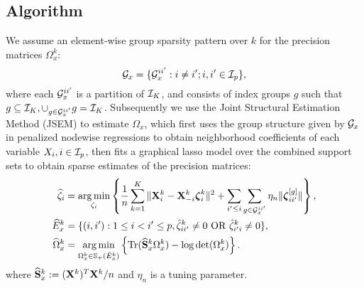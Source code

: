 \subsection{Algorithm}
\label{sec:algosection}
We assume an element-wise group sparsity pattern over $k$ for the precision matrices $\Omega_x^k$:
%
\[
{\cal{G}}_x = \{ {\cal{G}}_x^{ii'}: i \neq i'; i, i' \in {\cal{I}}_p \},
\]
%
where each ${\cal{G}}_x^{ii'}$ is a partition of ${\cal{I}}_K$, and consists of index groups $g$ such that $g \subseteq {\cal{I}}_K, \cup_{g \in {\cal{G}}_x^{ii'}} g = {\cal{I}}_K$. Subsequently we use the Joint Structural Estimation Method (JSEM) \citep{MaMichailidis15} to estimate $\Omega_x$, which first uses the group structure given by ${\cal{G}}_x$ in penalized nodewise regressions \citep{MeisenBuhlmann06} to obtain neighborhood coefficients of each variable $X_i, i \in {\cal{I}}_p$, then fits a graphical lasso model over the combined support sets to obtain sparse estimates of the precision matrices:
%
\begin{align}\label{eqn:jsem-model}
\widehat \zeta_i &= \operatorname*{arg\,min}_{\zeta_i} \left\{
\frac{1}{n} \sum_{k=1}^K \| {\mathbf{X}}_i^k - {\mathbf{X}}_{-i}^k {\boldsymbol{\zeta}}_i^k \|^2 +
\sum_{i' \leq i} \sum_{g \in {\cal{G}}_x^{ii'}} \eta_n \| {\boldsymbol{\zeta}}_{ii'}^{[g]} \| \right\}, \notag\\
\widehat E_x^k &= \{(i,i'): 1 \leq i < i' \leq p, \hat \zeta_{ii'}^k \neq 0 \text{ OR } \hat \zeta_{i'i}^k \neq 0 \}, \notag\\
\widehat \Omega_x^k &= \operatorname*{arg\,min}_{\Omega_x^k \in {\mathbb{S}}_+ (\hat E_x^k)}
\left\{ \operatorname*{Tr} (\widehat {{\mathbf{S}}}_x^k \Omega_x^k ) - \log \det (\Omega_x^k) \right\}.
\end{align}
%
where $\widehat {{\mathbf{S}}}_x^k := ({\mathbf{X}}^k)^T {\mathbf{X}}^k/n$ and $\eta_n$ is a tuning parameter.

